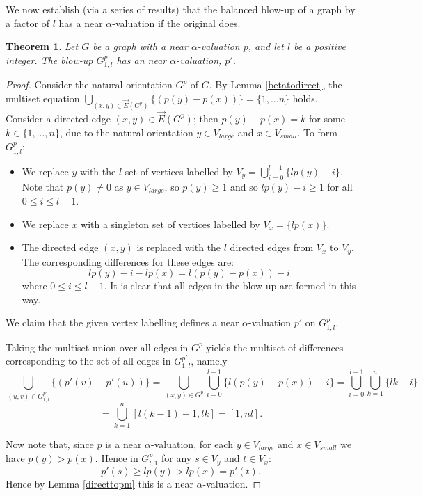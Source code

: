 \documentclass[12pt, a4paper]{article}
\newtheorem{theorem}{Theorem}[section]
\theoremstyle{definition}
\begin{document}
We now establish (via a series of results) that the balanced blow-up of a graph by a factor of $l$ has a near $\alpha$-valuation if the original does.
\begin{theorem}\label{pblowlarge}
    Let $G$ be a graph with a near $\alpha$-valuation $p$, and let $l$ be a positive integer. The blow-up $G^p_{1,l}$ has an near $\alpha$-valuation, $p'$.
\end{theorem}
\begin{proof}
Consider the natural orientation $G^p$ of $G$.  By Lemma \ref{betatodirect}, the multiset equation $\bigcup_{(x,y)\in \overrightarrow{E}(G^p)} \{(p(y)-p(x) )\} =\{1, \ldots n\}$ holds. Consider a directed edge $(x,y) \in \overrightarrow{E}(G^p)$; then $p(y)-p(x)=k$ for some $k\in \{1,\ldots,n\}$, due to the natural orientation $y \in V_{large}$ and $x \in V_{small}$. To form $G^p_{1,l}$:
\begin{itemize}
\item We replace $y$ with the $l$-set of vertices labelled by $V_y=\bigcup_{i=0}^{l-1}\{lp(y)-i\}$.
Note that $p(y) \neq 0$ as $y \in V_{large}$, so $p(y) \geq 1$ and so $lp(y)-i \geq 1$ for all $0 \leq i \leq l-1$.
\item We replace $x$ with a singleton set of vertices labelled by $V_x = \{lp(x)\}$.
\item The directed edge $(x,y)$ is replaced with the $l$ directed edges from $V_x$ to $V_y$.  The corresponding differences for these edges are:
\[lp(y)-i-lp(x)= l(p(y)-p(x))-i\]
where $0 \leq i \leq l-1$.  It is clear that all edges in the blow-up are formed in this way. 
\end{itemize}

We claim that the given vertex labelling defines a near $\alpha$-valuation $p'$ on $G^p_{1,l}$.

Taking the multiset union over all edges in $G^p$ yields the multiset of differences corresponding to the set of all edges in $G^{p'}_{1,l}$, namely 
\[\bigcup_{(u,v) \in G^{p'}_{1,l}}\{(p'(v)-p'(u))\}=\bigcup_{(x,y) \in G^p}\bigcup_{i =0}^{l-1}\{l(p(y)-p(x))-i\}=\bigcup_{i =0}^{l-1}\bigcup_{k=1}^{n}\{lk-i\}\]
\[=\bigcup_{k=1}^{n}[l(k-1)+1,lk] = [1,nl].\]

Now note that, since $p$ is a near $\alpha$-valuation, for each $ y \in V_{large}$ and $x \in V_{small}$ we have $p(y) > p(x)$. Hence in $G^p_{l,1}$ for any $s \in V_y$ and $t \in V_x$:
\[ p'(s) \geq l p(y) > l p(x) = p'(t).\]
Hence by Lemma \ref{directtopm} this is a near $\alpha$-valuation.
\end{proof}
\end{document}
